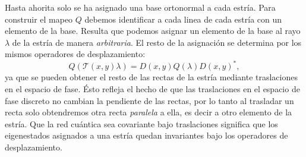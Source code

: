 \documentclass[a4paper]{report}
\begin{document}
  Hasta ahorita solo se ha asignado una base ortonormal a
  cada estría. Para construir el mapeo $Q$ debemos
  identificar a cada linea de cada estría con un elemento de
  la base. Resulta que podemos asignar un elemento de la
  base al rayo $\lambda$ de la estría de manera
  \textit{arbitraria}.  El resto de la asignación se
  determina por los mismos operadores de desplazamiento:
  \[
    Q(\mathcal T(x,y) \lambda)
    = D(x,y) Q(\lambda) D(x,y)^{*},
  \] 
  ya que se pueden obtener el resto de las rectas de la
  estría mediante traslaciones en el espacio de fase. Ésto
  refleja el hecho de que las traslaciones en el espacio
  de fase discreto no cambian la pendiente de las rectas,
  por lo tanto al trasladar un recta solo obtendremos otra
  recta \textit{paralela} a ella, es decir a otro elemento
  de la estría. Que la red cuántica sea covariante bajo
  traslaciones significa que los eigenestados asignados a
  una estría quedan invariantes bajo los operadores de
  desplazamiento. 
\end{document}
